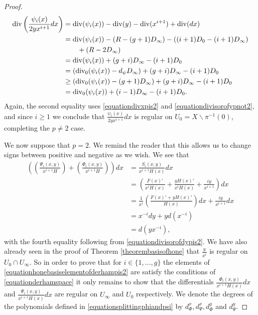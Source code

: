\begin{proof}
        \begin{align*}
        \operatorname{div} \left( \frac{\psi_i(x)}{2yx^{i+1}}dx\right) & =  \operatorname{div}(\psi_i(x)) - \operatorname{div}(y) - \operatorname{div}(x^{i+1}) + \operatorname{div} (dx) \\
        & =  \operatorname{div} (\psi_i(x) ) -(R - (g+1)D_\infty) - ((i+1)D_0 - (i+1)D_\infty) \\ 
        & \qquad + (R -2D_\infty) \\
        & =  \operatorname{div}(\psi_i(x)) + (g+i)D_\infty -(i+1)D_0 \\
        & =  (\operatorname{div}_0(\psi_i(x)) -d_\psi D_\infty) + (g+i)D_\infty -(i+1)D_0 \\
        & \geq \left( \operatorname{div}_0(\psi_i(x)) - (g+1)D_\infty \right) + (g+i)D_\infty -(i+1)D_0 \\
        & =  \operatorname{div}_0(\psi_i(x)) + (i-1)D_\infty - (i+1)D_0.
        \end{align*}
    Again, the second equality uses \eqref{equationdivxpis2} and \eqref{equationdivisorofypnot2}, and since $i\geq 1$ we conclude that $\frac{\psi_i(x)}{2yx^{i+1}}dx$ is regular on $U_0 = X \backslash \pi^{-1}(0)$, completing the $p\neq 2$ case.
    
    
    We now suppose that $p=2$.
    We remind the reader that this allows us to change signs between positive and negative as we wish.
    We see that
        \begin{align*}
        \left( \left( \frac{ \Psi_i(x,y)}{x^{i+1}H} \right) + \left( \frac{\Phi_i(x,y)}{x^{i+1}H} \right) \right) dx & =  \frac{S_i(x,y)}{x^{i+1}H(x)}dx \\
        & =  \left( \frac{F(x)'}{x^iH(x)} + \frac{yH(x)'}{x^iH(x)} + \frac{iy}{x^{i+1}} \right) dx \\
        & =  \frac{1}{x^i}\left( \frac{F(x)' + yH(x)'}{H(x)} \right) dx + \frac{iy}{x^{i+1}}dx \\
        & =  x^{-i}dy + yd \left( x^{-i}\right) \\
        & =  d\left( yx^{-i}\right),
        \end{align*}
    with the fourth equality following from \eqref{equationdivisorofdypis2}.
    We have also already seen in the proof of Theorem \ref{theorembasisofhone} that $\frac{y}{x^i}$ is regular on $U_0 \cap U_\infty$.
    So in order to prove that for $i\in \{1, \ldots, g\}$ the elements of \eqref{equationhonebasiselementofderhampis2} are satisfy the conditions of \eqref{equationderhamspace} it only remains to show that the differentials $\frac{\Phi_i(x,y)}{x^{i+1}H(x)}dx$ and $\frac{\Psi_i(x,y)}{x^{i+1}H(x)}dx$ are regular on $U_\infty$ and $U_0$ respectively.
    We denote the degrees of the polynomials defined in \eqref{equationsplittingphiandpsi} by $d_{\Phi}^x, d_{\Psi}^x, d_{\Phi}^y$ and $d_{\Psi}^y$.
    

\end{proof}
